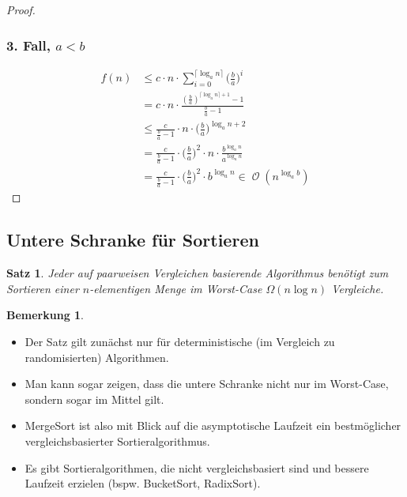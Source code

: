 \documentclass[a4paper,12pt]{article}
\DeclareMathOperator{\BigO}{\mathcal O}
\newtheorem{satz}[axiom]{Satz}
\theoremstyle{definition}
\newtheorem*{bemerkung}{Bemerkung}
\begin{document}
\begin{proof}
		\subsubsection*{3. Fall, $a < b$}
		\begin{align*}
			f(n) &\leq c \cdot n \cdot \sum_{i = 0}^{\lceil \log_a n\rceil}\big(\frac{b}{a}\big)^i\\
			&= c \cdot n \cdot \frac{(\frac{b}{a})^{\lceil \log_a n\rceil + 1} - 1}{\frac{b}{a} - 1}\\
			&\leq \frac{c}{\frac{b}{a} - 1} \cdot n \cdot \big(\frac{b}{a}\big)^{\log_a n + 2}\\
			&= \frac{c}{\frac{b}{a} - 1} \cdot \big(\frac{b}{a}\big)^2 \cdot n \cdot \frac{b^{\log_a n}}{a^{\log_a n}}\\
			&= \frac{c}{\frac{b}{a} - 1} \cdot \big(\frac{b}{a}\big)^2 \cdot b^{\log_a n} \in \BigO(n^{\log_a b})
		\end{align*}
	\end{proof}
	\subsection{Untere Schranke für Sortieren}
	\begin{satz}
		Jeder auf paarweisen Vergleichen basierende Algorithmus benötigt zum Sortieren einer $n$-elementigen Menge im Worst-Case $\Omega(n \log n)$ Vergleiche.
	\end{satz}
	\begin{bemerkung}
		\begin{itemize}
			\item Der Satz gilt zunächst nur für deterministische (im Vergleich zu randomisierten) Algorithmen.
			\item Man kann sogar zeigen, dass die untere Schranke nicht nur im Worst-Case, sondern sogar im Mittel gilt.
			\item MergeSort ist also mit Blick auf die asymptotische Laufzeit ein bestmöglicher vergleichsbasierter Sortieralgorithmus.
			\item Es gibt Sortieralgorithmen, die nicht vergleichsbasiert sind und bessere Laufzeit erzielen (bspw. BucketSort, RadixSort).
		\end{itemize}
	\end{bemerkung}
\end{document}

